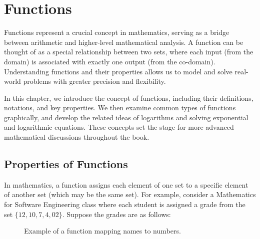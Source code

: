 \chapter{Functions}
\label{chap:ch1}
Functions represent a crucial concept in mathematics, serving as a bridge between arithmetic and higher-level mathematical analysis. A function can be thought of as a special relationship between two sets, where each input (from the domain) is associated with exactly one output (from the co-domain). Understanding functions and their properties allows us to model and solve real-world problems with greater precision and flexibility.

In this chapter, we introduce the concept of functions, including their definitions, notations, and key properties. We then examine common types of functions graphically, and develop the related ideas of logarithms and solving exponential and logarithmic equations. These concepts set the stage for more advanced mathematical discussions throughout the book.

\section{Properties of Functions}
In mathematics, a function assigns each element of one set to a specific element of another set (which may be the same set). For example, consider a Mathematics for Software Engineering class where each student is assigned a grade from the set \(\{12, 10, 7, 4, 02\}\). Suppose the grades are as follows:

\begin{figure}[htbp]
    \centering
    \caption{Example of a function mapping names to numbers.}
    \label{fig:names_to_numbers}
\end{figure}


